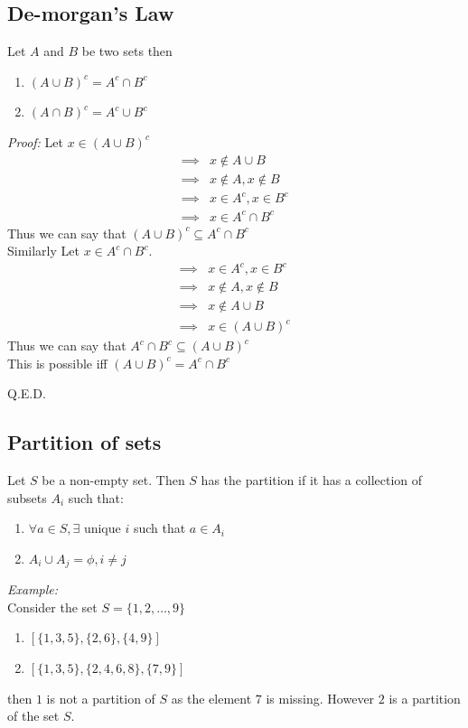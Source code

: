 \documentclass[11pt,letterpaper]{article}
\newenvironment{myproof} 
        {\textit{Proof:}}                                   
        {\begin{flushright} Q.E.D. \end{flushright}}
\newenvironment{example}                             
        {\noindent\textit{Example:}\\}
	{}
\begin{document}
\subsection{De-morgan's Law}
Let $A$ and $B$ be two sets then 
\begin{enumerate}
  \item $(A\cup B)^c = A^c \cap B^c$
  \item $(A\cap B)^c = A^c \cup B^c$
\end{enumerate}
\begin{myproof}
  Let $x \in (A \cup B)^c$ 
  \begin{align*}
    \implies & x \not \in A \cup B \\ 
    \implies & x \not \in A, x \not\in B \\
    \implies & x \in A^c , x \in B^c \\ 
    \implies & x \in A^c \cap B^c 
  \end{align*}
  Thus we can say that $(A\cup B)^c \subseteq A^c \cap B^c$\\
  Similarly Let $x \in A^c \cap B^c$.
  \begin{align*}
    \implies & x \in A^c , x \in B^c \\ 
    \implies & x \not \in A, x \not\in B \\
    \implies & x \not \in A \cup B \\ 
    \implies & x \in (A\cup B)^c
  \end{align*}
  Thus we can say that $A^c \cap B^c\subseteq(A\cup B)^c $\\
  This is possible iff $(A\cup B)^c = A^c \cap B^c$
\end{myproof}

\subsection{Partition of sets}
Let $S$ be a non-empty set. Then $S$ has the partition if it has a collection of subsets $A_i$ such that:
\begin{enumerate}
  \item $\forall a \in S, \exists $ unique $i$ such that $a \in A_i$
  \item $A_i \cup A_j = \phi, i \neq j$
\end{enumerate}
\begin{example}
  Consider the set $S = \{ 1,2, \dots, 9\}$\\ 
  \begin{enumerate}
    \item $[\{1,3,5\},\{2,6\},\{4,9\}]$
    \item $[\{1,3,5\},\{2,4,6,8\},\{7,9\}]$
  \end{enumerate}
  then $1$ is not a partition of $S$ as the element $7$ is missing. However $2$ is a partition of the set $S$.
\end{example}
\end{document}
